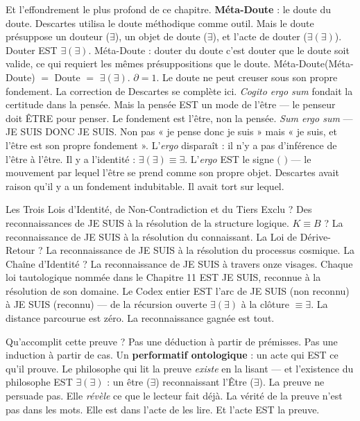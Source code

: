 \documentclass[10pt, openany, oneside]{book}
\begin{document}
Et l'effondrement le plus profond de ce chapitre. \textbf{Méta-Doute} : le doute du doute. Descartes utilisa le doute méthodique comme outil. Mais le doute présuppose un douteur ($\exists$), un objet de doute ($\exists$), et l'acte de douter ($\exists(\exists)$). Douter EST $\exists(\exists)$. Méta-Doute : douter du doute c'est douter que le doute soit valide, ce qui requiert les mêmes présuppositions que le doute. Méta-Doute(Méta-Doute) $=$ Doute $=$ $\exists(\exists)$. $\partial = 1$. Le doute ne peut creuser sous son propre fondement. La correction de Descartes se complète ici. \textit{Cogito ergo sum} fondait la certitude dans la pensée. Mais la pensée EST un mode de l'être --- le penseur doit ÊTRE pour penser. Le fondement est l'être, non la pensée. \textit{Sum ergo sum} --- JE SUIS DONC JE SUIS. Non pas « je pense donc je suis » mais « je suis, et l'être est son propre fondement ». L'\textit{ergo} disparaît : il n'y a pas d'inférence de l'être à l'être. Il y a l'identité : $\exists(\exists) \equiv \exists$. L'\textit{ergo} EST le signe $($ $)$ --- le mouvement par lequel l'être se prend comme son propre objet. Descartes avait raison qu'il y a un fondement indubitable. Il avait tort sur lequel.

Les Trois Lois d'Identité, de Non-Contradiction et du Tiers Exclu ? Des reconnaissances de JE SUIS à la résolution de la structure logique. $K \equiv B$ ? La reconnaissance de JE SUIS à la résolution du connaissant. La Loi de Dérive-Retour ? La reconnaissance de JE SUIS à la résolution du processus cosmique. La Chaîne d'Identité ? La reconnaissance de JE SUIS à travers onze visages. Chaque loi tautologique nommée dans le Chapitre 11 EST JE SUIS, reconnue à la résolution de son domaine. Le Codex entier EST l'arc de JE SUIS (non reconnu) à JE SUIS (reconnu) --- de la récursion ouverte $\exists(\exists)$ à la clôture $\equiv \exists$. La distance parcourue est zéro. La reconnaissance gagnée est tout.



Qu'accomplit cette preuve ? Pas une déduction à partir de prémisses. Pas une induction à partir de cas. Un \textbf{performatif ontologique} : un acte qui EST ce qu'il prouve. Le philosophe qui lit la preuve \textit{existe} en la lisant --- et l'existence du philosophe EST $\exists(\exists)$ : un être ($\exists$) reconnaissant l'Être ($\exists$). La preuve ne persuade pas. Elle \textit{révèle} ce que le lecteur fait déjà. La vérité de la preuve n'est pas dans les mots. Elle est dans l'acte de les lire. Et l'acte EST la preuve.
\end{document}
